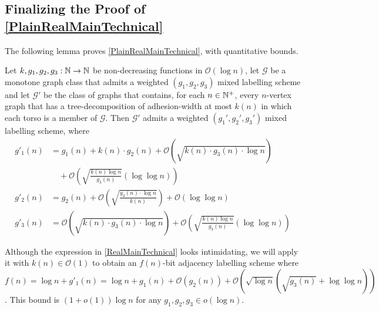\documentclass{patmorin}
\newcommand{\vida}[1]{{\color{pink} VD: #1}}
\newcommand{\gwen}[1]{\textcolor{Purple}{GJ: #1}}
\newcommand{\Oh}{\mathcal{O}}
\begin{document}


\subsection{Finalizing the Proof of \cref{PlainRealMainTechnical}}


The following lemma proves \cref{PlainRealMainTechnical}, with quantitative bounds.


\begin{lem}\label{RealMainTechnical}
    Let $k, g_1,g_2,g_3:\mathbb{N}\to\mathbb{N}$ be non-decreasing functions in $\Oh(\log n)$, let $\mathcal{G}$ be a monotone graph class that admits a weighted $(g_1,g_2,g_3)$ mixed labelling scheme and let $\mathcal{G}'$ be the class of graphs that contains, for each $n\in\mathbb{N}^+$, every $n$-vertex graph that has a tree-decomposition of adhesion-width at most $k(n)$ in which each torso is a member of $\mathcal{G}$.  Then $\mathcal{G}'$ admits a weighted $(g_1',g_2',g_3')$ mixed labelling scheme, where
    \begin{align*}
     g'_1(n) & = g_1(n) + k(n)\cdot g_2(n) + \Oh\left(\sqrt{k(n)\cdot g_3(n)\cdot\log n}\right) \\
     & \quad {} + \Oh\left(\sqrt{\frac{k(n)\log n}{g_3(n)}}(\log\log n)\right)  \\
     g'_2(n) & = g_2(n) + \Oh\left(\sqrt{\frac{g_3(n)\cdot\log n}{k(n)}}\right) + \Oh(\log\log n)  \\
     g'_3(n) & = \Oh\left(\sqrt{k(n)\cdot g_3(n)\cdot\log n}\right) + \Oh\left(\sqrt{\frac{k(n)\log n}{g_3(n)}}(\log\log n)\right)
   \end{align*}
  \end{lem}

  Although the expression in \cref{RealMainTechnical} looks intimidating, we will apply it with $k(n)\in \Oh(1)$ to obtain an $f(n)$-bit adjacency labelling scheme where $f(n)=\log n+ g'_1(n) = \log n + g_1(n) + \Oh(g_2(n)) + \Oh\left(\sqrt{\log n}\left(\sqrt{g_3(n)}+\log\log n\right)\right)$. This bound is $(1+o(1))\log n$ for any $g_1,g_2,g_3\in o(\log n)$.
\end{document}
